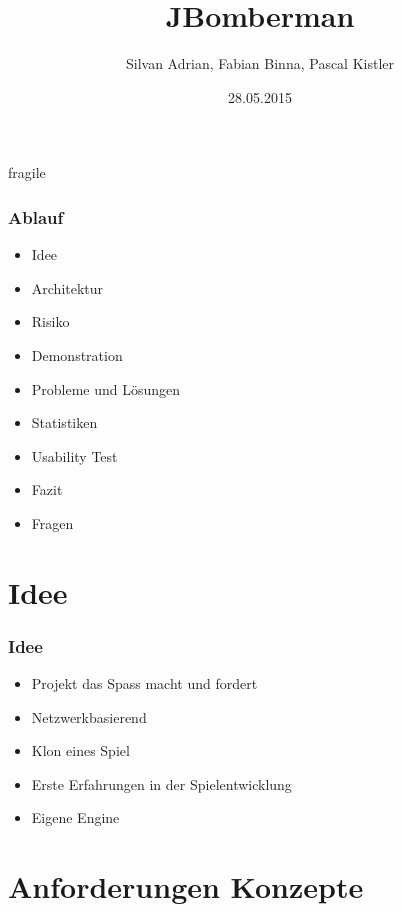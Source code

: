 \documentclass[10pt, compress]{beamer}
\title{JBomberman}
\subtitle{}
\date{28.05.2015}
\author{Silvan Adrian, Fabian Binna, Pascal Kistler}
\institute{Hochschule für Technik Rapperswil \newline \newline
Webseite: \textcolor{red}{\href{http://se2p.zonk.io}{http://se2p.zonk.io}}}
\begin{document}
\maketitle

\begin{frame}{fragile}
	\frametitle{Ablauf}
	\begin{itemize}
	\item Idee
	\item Architektur
	\item Risiko
	\item Demonstration
	\item Probleme und Lösungen
	\item Statistiken
	\item Usability Test
	\item Fazit
	\item Fragen
	\end{itemize}
\end{frame}


\section{Idee}
\begin{frame}[fragile]
  \frametitle{Idee}
	\begin{itemize}
	  \item Projekt das Spass macht und fordert
	  \item Netzwerkbasierend
	  \item Klon eines Spiel
	  \item Erste Erfahrungen in der Spielentwicklung
	  \item Eigene Engine
	\end{itemize}
\end{frame}



\section{Anforderungen  Konzepte}
\end{document}
